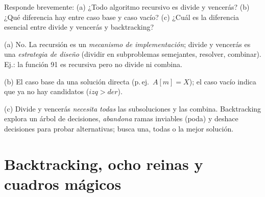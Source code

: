 \begin{prob}
Responde brevemente: (a) ¿Todo algoritmo recursivo es divide y vencerás? (b) ¿Qué diferencia hay entre caso base y caso vacío? (c) ¿Cuál es la diferencia esencial entre divide y vencerás y backtracking?
\end{prob}
\begin{sol}
(a) No. La recursión es un \emph{mecanismo de implementación}; divide y vencerás es una \emph{estrategia de diseño} (dividir en subproblemas semejantes, resolver, combinar). Ej.: la función 91 es recursiva pero no divide ni combina.

(b) El caso base da una solución directa (p.\,ej.\ $A[m]=X$); el caso vacío indica que ya no hay candidatos ($izq>der$).

(c) Divide y vencerás \emph{necesita todas} las subsoluciones y las combina. Backtracking explora un árbol de decisiones, \emph{abandona} ramas inviables (poda) y deshace decisiones para probar alternativas; busca una, todas o la mejor solución.
\end{sol}

\section{Backtracking, ocho reinas y cuadros mágicos}

